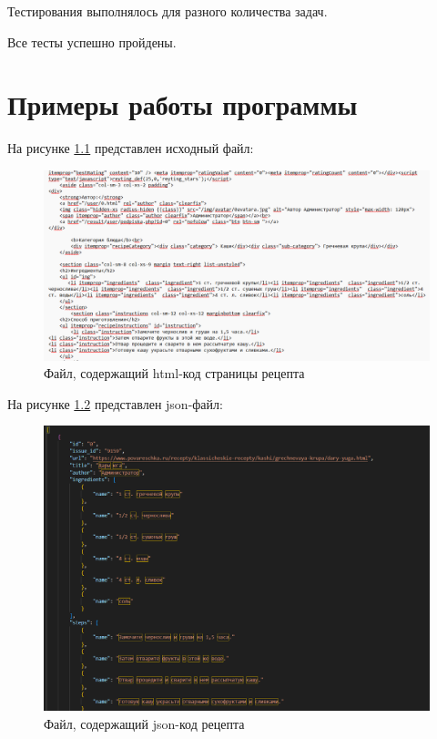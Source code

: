 \documentclass[a4paper, 12pt]{extreport}
\begin{document}
Тестирования выполнялось для разного количества задач.

Все тесты успешно пройдены.

\chapter{Примеры работы программы}

На рисунке \ref{pic:in} представлен исходный файл:
\begin{figure}[h]
	\centering
	\includegraphics[scale=0.5]{tools/in.png}
	\caption{Файл, содержащий html-код страницы рецепта}
	\label{pic:in}
\end{figure}

На рисунке \ref{pic:out} представлен json-файл:
\begin{figure}[h]
	\centering
	\includegraphics[scale=0.5]{tools/out.png}
	\caption{Файл, содержащий json-код рецепта}
	\label{pic:out}
\end{figure}
\end{document}
